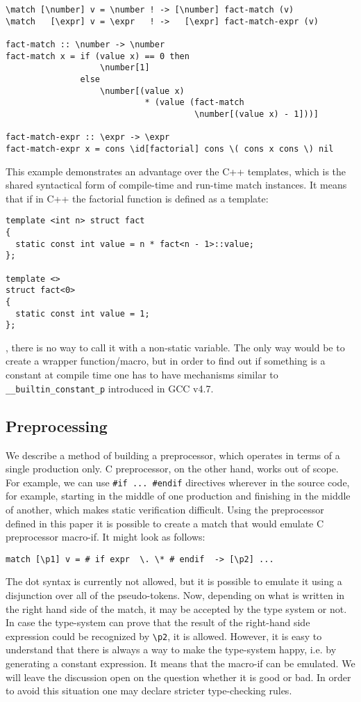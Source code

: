 \begin{verbatim}
\match [\number] v = \number ! -> [\number] fact-match (v)
\match   [\expr] v = \expr   ! ->   [\expr] fact-match-expr (v)

fact-match :: \number -> \number
fact-match x = if (value x) == 0 then
                   \number[1]
               else
                   \number[(value x) 
                            * (value (fact-match 
                                      \number[(value x) - 1]))]

fact-match-expr :: \expr -> \expr
fact-match-expr x = cons \id[factorial] cons \( cons x cons \) nil
\end{verbatim}

This example demonstrates an advantage over the C++ templates, which
is the shared syntactical form of compile-time and run-time match instances.
It means that if in C++ the factorial function is defined as a template:
\begin{verbatim}
template <int n> struct fact 
{
  static const int value = n * fact<n - 1>::value;
};
 
template <>
struct fact<0> 
{
  static const int value = 1;
};
\end{verbatim}
, there is no way to call it with a non-static variable.  The only way 
would be to create a wrapper function/macro, but in order to find out
if something is a constant at compile time one has to have mechanisms
similar to \verb|__builtin_constant_p| introduced in GCC v4.7.

\subsection{Preprocessing}
We describe a method of building a preprocessor, which operates in terms of a
single production only.  C preprocessor, on the other hand, works out of scope.
For example, we can use \verb|#if ... #endif| directives wherever in the
source code, for example, starting in the middle of one production and
finishing in the middle of another, which makes static verification difficult.
Using the preprocessor defined in this paper it is possible to create a match
that would emulate C preprocessor macro-if.  It might look as follows:
\begin{verbatim}
match [\p1] v = # if expr  \. \* # endif  -> [\p2] ...
\end{verbatim}
The dot syntax is currently not allowed, but it is possible to emulate it using
a disjunction over all of the pseudo-tokens.  Now, depending on what is written
in the right hand side of the match, it may be accepted by the type system or
not.  In case the type-system can prove that the result of the right-hand side
expression could be recognized by \verb|\p2|, it is allowed.  However, it is
easy to understand that there is always a way to make the type-system happy,
i.e. by generating a constant expression.  It means that the macro-if can be
emulated.  We will leave the discussion open on the question whether it is good
or bad.  In order to avoid this situation one may declare stricter
type-checking rules.
